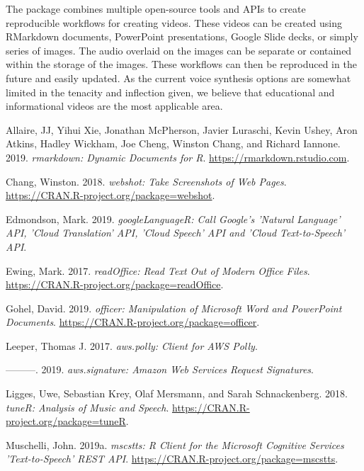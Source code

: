 The  package combines multiple open-source tools and APIs to
create reproducible workflows for creating videos. These videos can be
created using RMarkdown documents, PowerPoint presentations, Google
Slide decks, or simply series of images. The audio overlaid on the
images can be separate or contained within the storage of the images.
These workflows can then be reproduced in the future and easily updated.
As the current voice synthesis options are somewhat limited in the
tenacity and inflection given, we believe that educational and
informational videos are the most applicable area.



\hypertarget{refs}{}
\leavevmode\hypertarget{ref-rmarkdown}{}%
Allaire, JJ, Yihui Xie, Jonathan McPherson, Javier Luraschi, Kevin
Ushey, Aron Atkins, Hadley Wickham, Joe Cheng, Winston Chang, and
Richard Iannone. 2019. \emph{rmarkdown: Dynamic Documents for R}.
\url{https://rmarkdown.rstudio.com}.

\leavevmode\hypertarget{ref-webshot}{}%
Chang, Winston. 2018. \emph{webshot: Take Screenshots of Web Pages}.
\url{https://CRAN.R-project.org/package=webshot}.

\leavevmode\hypertarget{ref-googleLanguageR}{}%
Edmondson, Mark. 2019. \emph{googleLanguageR: Call Google's 'Natural
Language' API, 'Cloud Translation' API, 'Cloud Speech' API and 'Cloud
Text-to-Speech' API}.

\leavevmode\hypertarget{ref-readOffice}{}%
Ewing, Mark. 2017. \emph{readOffice: Read Text Out of Modern Office
Files}. \url{https://CRAN.R-project.org/package=readOffice}.

\leavevmode\hypertarget{ref-officer}{}%
Gohel, David. 2019. \emph{officer: Manipulation of Microsoft Word and
PowerPoint Documents}. \url{https://CRAN.R-project.org/package=officer}.

\leavevmode\hypertarget{ref-aws.polly}{}%
Leeper, Thomas J. 2017. \emph{aws.polly: Client for AWS Polly}.

\leavevmode\hypertarget{ref-aws.signature}{}%
---------. 2019. \emph{aws.signature: Amazon Web Services Request
Signatures}.

\leavevmode\hypertarget{ref-tuneR}{}%
Ligges, Uwe, Sebastian Krey, Olaf Mersmann, and Sarah Schnackenberg.
2018. \emph{tuneR: Analysis of Music and Speech}.
\url{https://CRAN.R-project.org/package=tuneR}.

\leavevmode\hypertarget{ref-mscstts}{}%
Muschelli, John. 2019a. \emph{mscstts: R Client for the Microsoft
Cognitive Services 'Text-to-Speech' REST API}.
\url{https://CRAN.R-project.org/package=mscstts}.

